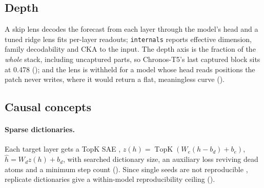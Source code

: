 \subsection{Depth}
\label{sec:depth}

A skip lens decodes the forecast from each layer through the model's head and a tuned ridge lens
\citep{belrose2023tuned} fits per-layer readouts; \texttt{internals} reports effective dimension, family
decodability and CKA to the input. The depth axis is the fraction of the \emph{whole} stack, including
uncaptured parts, so Chronos-T5's last captured block sits at 0.478 (); and the lens is withheld
for a model whose head reads positions the patch never writes, where it would return a flat, meaningless
curve ().

\subsection{Causal concepts}
\label{sec:concepts}

\paragraph{Sparse dictionaries.} Each target layer gets a TopK SAE \citep{makhzani2013ksparse,gao2025topk},
$z(h)=\operatorname{TopK}(W_e(h-b_d)+b_e)$, $\hat h=W_d z(h)+b_d$, with searched dictionary size, an auxiliary
loss reviving dead atoms and a minimum step count (). Since single seeds are not reproducible
\citep{paulo2025seeds}, replicate dictionaries give a within-model reproducibility ceiling ().

